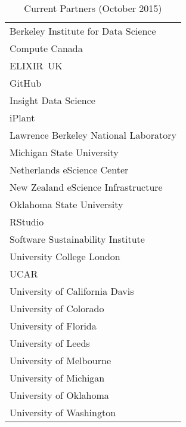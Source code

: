 \documentclass[10pt,a4paper,twocolumn]{article}
\begin{document}
\begin{table}[h]
\begin{tabular}{l}
Berkeley Institute for Data Science \\
Compute Canada \\
ELIXIR~UK \\
GitHub \\
Insight Data Science \\
iPlant \\
Lawrence Berkeley National Laboratory \\
Michigan State University \\
Netherlands eScience Center \\
New Zealand eScience Infrastructure \\
Oklahoma State University \\
RStudio \\
Software Sustainability Institute \\
University College London \\
UCAR \\
University of California Davis \\
University of Colorado \\
University of Florida \\
University of Leeds \\
University of Melbourne \\
University of Michigan \\
University of Oklahoma \\
University of Washington \\
\end{tabular}
\caption{Current Partners (October 2015)}
\label{t:current-partners}
\end{table}
\end{document}
